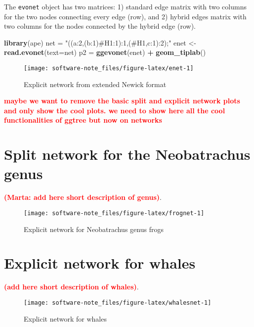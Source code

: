 \documentclass[]{IEEEtran}
\newenvironment{Shaded}{\begin{snugshade}}{\end{snugshade}}
\newcommand{\DataTypeTok}[1]{\textcolor[rgb]{0.13,0.29,0.53}{#1}}
\newcommand{\KeywordTok}[1]{\textcolor[rgb]{0.13,0.29,0.53}{\textbf{#1}}}
\newcommand{\NormalTok}[1]{#1}
\newcommand{\OperatorTok}[1]{\textcolor[rgb]{0.81,0.36,0.00}{\textbf{#1}}}
\newcommand{\StringTok}[1]{\textcolor[rgb]{0.31,0.60,0.02}{#1}}
\begin{document}
The \texttt{evonet} object has two matrices: 1) standard edge matrix with two columns for the two nodes connecting every edge (row), and 2) hybrid edges matrix with two columns for the nodes connected by the hybrid edge (row).

\begin{Shaded}
\begin{Highlighting}[]
\KeywordTok{library}\NormalTok{(ape)}
\NormalTok{net =}\StringTok{ "((a:2,(b:1)#H1:1):1,(#H1,c:1):2);"}
\NormalTok{enet <-}\StringTok{ }\KeywordTok{read.evonet}\NormalTok{(}\DataTypeTok{text=}\NormalTok{net)}
\NormalTok{p2 =}\StringTok{ }\KeywordTok{ggevonet}\NormalTok{(enet) }\OperatorTok{+}\StringTok{ }\KeywordTok{geom_tiplab}\NormalTok{() }
\end{Highlighting}
\end{Shaded}

\begin{figure}[H]

{\centering \texttt{[image: software-note\_files/figure-latex/enet-1]} 

}

\caption{Explicit network from extended Newick format}\label{fig:enet}
\end{figure}

\textcolor{red}{\textbf{maybe we want to remove the basic split and explicit network plots and only show the cool plots. we need to show here all the cool functionalities of ggtree but now on networks}}

\hypertarget{split-network-for-the-neobatrachus-genus}{%
\section{Split network for the Neobatrachus genus}\label{split-network-for-the-neobatrachus-genus}}

\textcolor{red}{\textbf{(Marta: add here short description of genus)}}.

\begin{figure}[H]

{\centering \texttt{[image: software-note\_files/figure-latex/frognet-1]} 

}

\caption{Explicit network for Neobatrachus genus frogs}\label{fig:frognet}
\end{figure}

\hypertarget{explicit-network-for-whales}{%
\section{Explicit network for whales}\label{explicit-network-for-whales}}

\textcolor{red}{\textbf{(add here short description of whales)}}.

\begin{figure}[H]

{\centering \texttt{[image: software-note\_files/figure-latex/whalesnet-1]} 

}

\caption{Explicit network for whales}\label{fig:whalesnet}
\end{figure}


\end{document}
